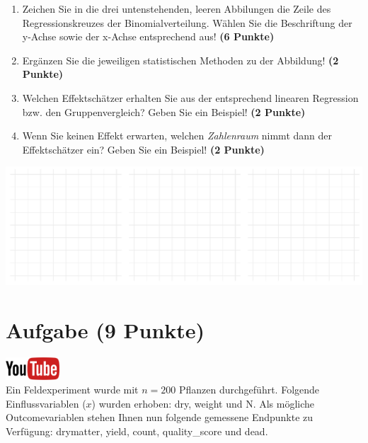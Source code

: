 \documentclass[a4paper, 9pt]{scrartcl}\usepackage[]{graphicx}\usepackage[]{xcolor}
\makeatletter
\def\maxwidth{ %
  \ifdim\Gin@nat@width>\linewidth
    \linewidth
  \else
    \Gin@nat@width
  \fi
}
\makeatother
\begin{document}
\begin{enumerate}
\item Zeichen Sie in die drei untenstehenden, leeren Abbilungen die Zeile des
  Regressionskreuzes der Binomialverteilung. W{\"a}hlen Sie die Beschriftung der
  y-Achse sowie der x-Achse entsprechend aus! \textbf{(6 Punkte)}
\item Erg{\"a}nzen Sie die jeweiligen statistischen Methoden zu der Abbildung! \textbf{(2 Punkte)}
\item Welchen Effektsch{\"a}tzer erhalten Sie aus der entsprechend linearen
  Regression bzw. den Gruppenvergleich? Geben Sie ein Beispiel! \textbf{(2 Punkte)}
\item Wenn Sie keinen Effekt erwarten, welchen \textit{Zahlenraum} nimmt dann
  der Effektsch{\"a}tzer ein? Geben Sie ein Beispiel! \textbf{(2 Punkte)}
\end{enumerate}



{\centering \includegraphics[width=\maxwidth]{img/regression-01-1} 

}



 
\clearpage

\section{Aufgabe \hfill (9 Punkte)}

\hfill\href{https://youtu.be/AwQEcQWLFCw}{\includegraphics[width =
  2cm]{img/youtube}}\\[1Ex]



Ein Feldexperiment wurde mit $n = 200$ Pflanzen durchgef{\"u}hrt. Folgende
Einflussvariablen ($x$) wurden erhoben: dry, weight und N. Als m{\"o}gliche Outcomevariablen stehen Ihnen nun
folgende gemessene Endpunkte zu Verf{\"u}gung: drymatter, yield, count, quality\_score und dead.
\end{document}
